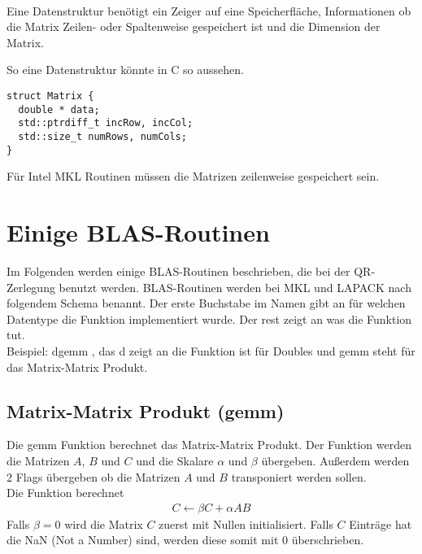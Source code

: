 \\



Eine Datenstruktur benötigt ein Zeiger auf eine Speicherfläche, Informationen ob die Matrix Zeilen- oder Spaltenweise gespeichert ist und die Dimension der Matrix. 

So eine Datenstruktur könnte in C so aussehen.
\begin{lstlisting}
struct Matrix {
  double * data;
  std::ptrdiff_t incRow, incCol;
  std::size_t numRows, numCols;
}
\end{lstlisting}

Für Intel MKL Routinen müssen die Matrizen zeilenweise gespeichert sein.


\section{Einige BLAS-Routinen}
Im Folgenden werden einige BLAS-Routinen beschrieben, die bei der QR-Zerlegung benutzt werden.
BLAS-Routinen werden bei MKL und LAPACK nach folgendem Schema benannt.
Der erste Buchstabe im Namen gibt an für welchen Datentype die Funktion implementiert wurde. Der rest zeigt an was die Funktion tut.\\
Beispiel: \glqq dgemm \flqq, das d zeigt an die Funktion ist für Doubles und 	\glqq gemm \flqq steht für das Matrix-Matrix Produkt.

\subsection{Matrix-Matrix Produkt (gemm)}
Die \glqq gemm \flqq Funktion berechnet das Matrix-Matrix Produkt.
Der Funktion werden die Matrizen $A$, $B$ und $C$ und die Skalare $\alpha$ und $\beta$ übergeben. Außerdem werden 2 Flags übergeben ob die Matrizen $A$ und $B$ transponiert werden sollen.\\
Die Funktion berechnet
\begin{align}
	C \leftarrow \beta  C + \alpha  A  B
\end{align}
Falls $\beta = 0$ wird die Matrix $C$ zuerst mit Nullen initialisiert. Falls $C$ Einträge hat die NaN (Not a Number) sind, werden diese somit mit 0 überschrieben.

